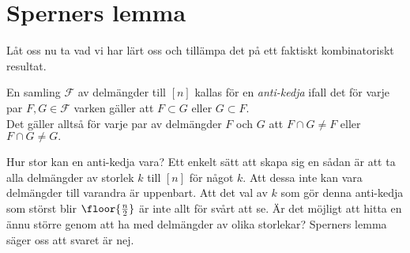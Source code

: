 \documentclass[nobib]{tufte-handout}
\begin{document}
\section{Sperners lemma}

Låt oss nu ta vad vi har lärt oss och tillämpa det på ett faktiskt kombinatoriskt resultat.

\begin{definition}
    En samling $\mathcal{F}$ av delmängder till $[n]$ kallas för en \emph{anti-kedja} ifall det för varje par $F, G \in \mathcal{F}$ varken gäller att $F \subset G$ eller $G \subset F$.\\
    Det gäller alltså för varje par av delmängder $F$ och $G$ att $F \cap G \neq F$ eller $F \cap G \neq G.$
\end{definition}

Hur stor kan en anti-kedja vara? Ett enkelt sätt att skapa sig en sådan är att ta alla delmängder av storlek $k$ till $[n]$ för något $k$. Att dessa inte kan vara delmängder till varandra är uppenbart. Att det val av $k$ som gör denna anti-kedja som störst blir $\floor{\frac{n}{2}}$ är inte allt för svårt att se. Är det möjligt att hitta en ännu större genom att ha med delmängder av olika storlekar? Sperners lemma säger oss att svaret är nej.
\end{document}
